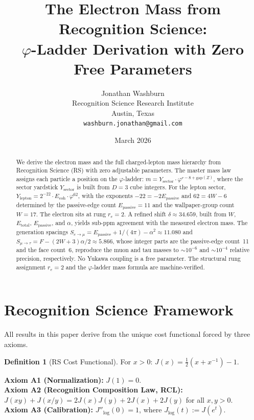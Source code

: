 \documentclass[12pt,a4paper]{article}
\title{The Electron Mass from Recognition Science:\\
$\varphi$-Ladder Derivation with Zero Free Parameters}
\author{Jonathan Washburn\\
Recognition Science Research Institute\\
Austin, Texas\\
\texttt{washburn.jonathan@gmail.com}}
\date{March 2026}
\theoremstyle{definition}
\newtheorem{definition}[theorem]{Definition}
\theoremstyle{remark}
\begin{document}
\maketitle

\begin{abstract}
We derive the electron mass and the full charged-lepton mass
hierarchy from Recognition Science (RS) with zero adjustable
parameters.  The master mass law assigns each particle a position
on the $\varphi$-ladder:
$m = Y_{\mathrm{sector}} \cdot \varphi^{r - 8 + \mathrm{gap}(Z)}$,
where the sector yardstick $Y_{\mathrm{sector}}$ is built from
$D = 3$ cube integers.  For the lepton sector,
$Y_{\mathrm{lepton}} = 2^{-22} \cdot E_{\mathrm{coh}} \cdot
\varphi^{62}$, with the exponents $-22 = -2E_{\mathrm{passive}}$
and $62 = 4W - 6$ determined by the passive-edge count
$E_{\mathrm{passive}} = 11$ and the wallpaper-group count $W = 17$.
The electron sits at rung $r_e = 2$.  A refined shift
$\delta \approx 34.659$, built from $W$, $E_{\mathrm{total}}$,
$E_{\mathrm{passive}}$, and $\alpha$, yields sub-ppm agreement
with the measured electron mass.  The generation spacings
$S_{e \to \mu} = E_{\mathrm{passive}} + 1/(4\pi) - \alpha^2
\approx 11.080$ and
$S_{\mu \to \tau} = F - (2W + 3)\alpha/2 \approx 5.866$,
whose integer parts are the passive-edge count~11 and the
face count~6, reproduce the muon and tau masses to
$\sim\!10^{-6}$ and $\sim\!10^{-4}$ relative precision,
respectively.  No Yukawa coupling is a free parameter.
The structural rung assignment $r_e = 2$ and the
$\varphi$-ladder mass formula are machine-verified.
\end{abstract}

\section{Recognition Science Framework}
\label{sec:framework}

All results in this paper derive from the unique cost functional
forced by three axioms.

\begin{definition}[RS Cost Functional]
For $x > 0$: $J(x) = \tfrac{1}{2}(x + x^{-1}) - 1$.
\end{definition}

\noindent\textbf{Axiom A1 (Normalization):} $J(1) = 0$.\\
\textbf{Axiom A2 (Recognition Composition Law, RCL):}
$J(xy)+J(x/y)=2J(x)J(y)+2J(x)+2J(y)$ for all $x,y>0$.\\
\textbf{Axiom A3 (Calibration):} $J''_{\log}(0) = 1$, where
$J_{\log}(t) := J(e^t)$.
\end{document}
